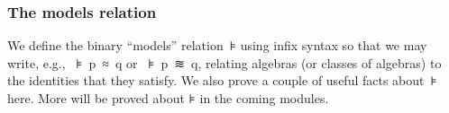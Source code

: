 \subsubsection{The models relation}\label{the-models-relation}

We define the binary ``models'' relation~\af ⊧ using infix syntax so that we may write, e.g., ~\af ⊧~\ab p~\af ≈~\ab q or ~\af ⊧~\ab p~\af ≋~\ab q, relating algebras (or classes of algebras) to the identities that they satisfy. We also prove a couple of useful facts about~\af ⊧ here. More will be proved about \af ⊧ in the coming modules.
\ccpad
\begin{code}%
\>[0]\AgdaSpace{}%
\AgdaModule{\AgdaUnderscore{}}\AgdaSpace{}%
\AgdaSymbol{\{}\AgdaSpace{}%
\AgdaSpace{}%
\AgdaSymbol{:}\AgdaSpace{}%
\AgdaSymbol{\}\{}\AgdaSpace{}%
\AgdaSymbol{:}\AgdaSpace{}%
\AgdaSpace{}%
\AgdaSymbol{\}}\AgdaSpace{}%
\<%
\\
%
\\[\AgdaEmptyExtraSkip]%
\>[0][@{}l@{\AgdaIndent{0}}]%
\>[1]\AgdaSpace{}%
\AgdaSymbol{:}\AgdaSpace{}%
\AgdaSpace{}%
\AgdaSpace{}%
\AgdaSpace{}%
\AgdaSpace{}%
\AgdaSpace{}%
\AgdaSpace{}%
\AgdaSpace{}%
\AgdaSpace{}%
\AgdaSpace{}%
\AgdaSpace{}%
\AgdaSpace{}%
\AgdaSpace{}%
\AgdaSpace{}%
\<%
\\
%
\\[\AgdaEmptyExtraSkip]%
%
\>[1]\AgdaSpace{}%
\AgdaSpace{}%
\AgdaSpace{}%
\AgdaSpace{}%
\AgdaSpace{}%
\AgdaSymbol{=}\AgdaSpace{}%
\AgdaSymbol{(}\AgdaSpace{}%
\AgdaSpace{}%
\AgdaSymbol{)}\AgdaSpace{}%
\AgdaSpace{}%
\AgdaSymbol{(}\AgdaSpace{}%
\AgdaSpace{}%
\AgdaSymbol{)}\<%
\\
%
\\[\AgdaEmptyExtraSkip]%
%
\\[\AgdaEmptyExtraSkip]%
%
\>[1]\AgdaSpace{}%

\end{code}

